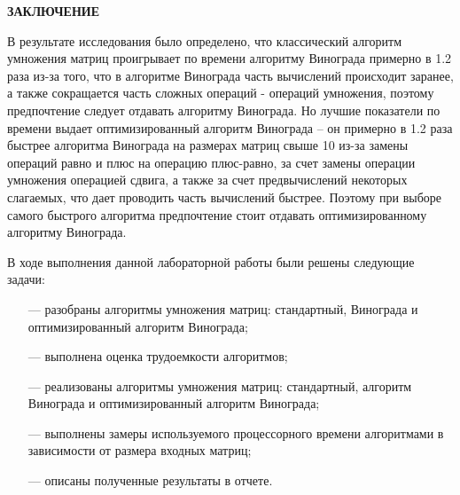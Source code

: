 \begin{center}
    \textbf{ЗАКЛЮЧЕНИЕ}
\end{center}

В результате исследования было определено, что классический алгоритм умножения матриц проигрывает по времени алгоритму Винограда примерно в 1.2 раза из-за того, что в алгоритме Винограда часть вычислений происходит заранее, а также сокращается часть сложных операций - операций умножения, поэтому предпочтение следует отдавать алгоритму Винограда. Но лучшие показатели по времени выдает оптимизированный алгоритм Винограда -- он примерно в 1.2 раза быстрее алгоритма Винограда на размерах матриц свыше 10 из-за замены операций равно и плюс на операцию плюс-равно, за счет замены операции умножения операцией сдвига, а также за счет предвычислений некоторых слагаемых, что дает проводить часть вычислений быстрее. Поэтому при выборе самого быстрого алгоритма предпочтение стоит отдавать оптимизированному алгоритму Винограда.


В ходе выполнения данной лабораторной работы были решены следующие задачи:
\begin{itemize} 
    \item[---] разобраны алгоритмы умножения матриц: стандартный, Винограда и оптимизированный алгоритм Винограда; 
    \item[---] выполнена оценка трудоемкости алгоритмов; 
    \item[---] реализованы алгоритмы умножения матриц: стандартный, алгоритм Винограда и оптимизированный алгоритм Винограда; 
    \item[---] выполнены замеры используемого процессорного времени алгоритмами в зависимости от размера входных матриц; 
    \item[---] описаны полученные результаты в отчете. 
\end{itemize}